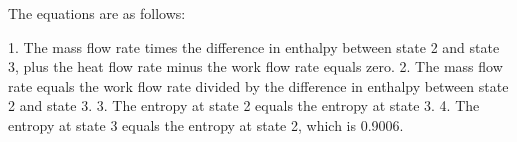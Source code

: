 The equations are as follows:

1. The mass flow rate times the difference in enthalpy between state 2 and state 3, plus the heat flow rate minus the work flow rate equals zero.
2. The mass flow rate equals the work flow rate divided by the difference in enthalpy between state 2 and state 3.
3. The entropy at state 2 equals the entropy at state 3.
4. The entropy at state 3 equals the entropy at state 2, which is 0.9006.